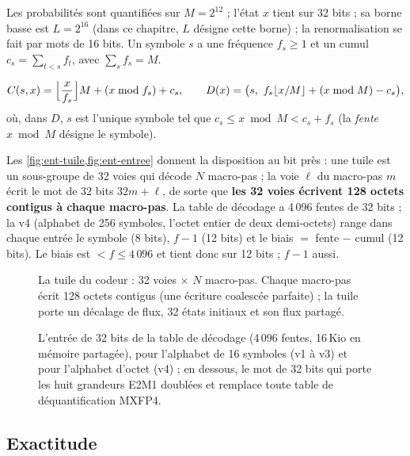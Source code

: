 Les probabilités sont quantifiées sur $M = 2^{12}$ ; l'état $x$ tient sur 32 bits ; sa borne basse est $L = 2^{16}$ (dans ce chapitre, $L$ désigne cette borne) ; la renormalisation se fait par mots de 16 bits. Un symbole $s$ a une fréquence $f_s \ge 1$ et un cumul $c_s = \sum_{t<s} f_t$, avec $\sum_s f_s = M$.

\begin{definition}\label{def:rans}
\[
C(s, x) = \Bigl\lfloor \frac{x}{f_s} \Bigr\rfloor M + (x \bmod f_s) + c_s,
\qquad
D(x) = \bigl(s,\ f_s \lfloor x/M \rfloor + (x \bmod M) - c_s\bigr),
\]
où, dans $D$, $s$ est l'unique symbole tel que $c_s \le x \bmod M < c_s + f_s$ (la \emph{fente} $x \bmod M$ désigne le symbole).
\end{definition}

Les \cref{fig:ent-tuile,fig:ent-entree} donnent la disposition au bit près : une tuile est un sous-groupe de 32 voies qui décode $N$ macro-pas ; la voie $\ell$ du macro-pas $m$ écrit le mot de 32 bits $32m + \ell$, de sorte que \textbf{les 32 voies écrivent 128 octets contigus à chaque macro-pas}. La table de décodage a 4\,096 fentes de 32 bits ; la v4 (alphabet de 256 symboles, l'octet entier de deux demi-octets) range dans chaque entrée le symbole (8 bits), $f - 1$ (12 bits) et le biais $=$ fente $-$ cumul (12 bits). Le biais est $< f \le 4\,096$ et tient donc sur 12 bits ; $f - 1$ aussi.

\begin{figure}[ht]
\centering
\resizebox{\linewidth}{!}{\SchemaTuileRans}
\caption[La tuile du codeur rANS entrelacé]{La tuile du codeur : 32 voies $\times$ $N$ macro-pas. Chaque macro-pas écrit 128 octets contigus (une écriture coalescée parfaite) ; la tuile porte un décalage de flux, 32 états initiaux et son flux partagé.}
\label{fig:ent-tuile}
\end{figure}

\begin{figure}[ht]
\centering
\resizebox{\linewidth}{!}{\SchemaEntreeTable}
\caption[L'entrée de la table de décodage, au bit près]{L'entrée de 32 bits de la table de décodage (4\,096 fentes, 16\,Kio en mémoire partagée), pour l'alphabet de 16 symboles (v1 à v3) et pour l'alphabet d'octet (v4) ; en dessous, le mot de 32 bits qui porte les huit grandeurs E2M1 doublées et remplace toute table de déquantification MXFP4.}
\label{fig:ent-entree}
\end{figure}

\subsection{Exactitude}

